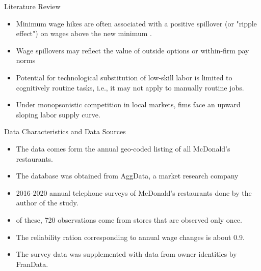 \documentclass[12pt]{beamer}
\begin{document}
\begin{frame}[allowframebreaks]{Literature Review}
	\begin{itemize}
		\item Minimum wage hikes are often associated with a positive spillover (or "ripple effect") on wages above the new minimum \cite{cengiz2019effect}.
		\item Wage spillovers may reflect the value of outside options or within-firm pay norms \cite{flinn2006minimum}
		\item Potential for technological substitution of low-skill labor is limited to cognitively routine tasks, i.e., it may not apply to manually routine jobs. \cite{phelan2019hedonic}
		\item Under monopsonistic competition in local markets, fims face an upward sloping labor supply curve. \cite{manning2013monopsony}
	\end{itemize}

\end{frame}

\begin{frame}[allowframebreaks]{Data Characteristics and Data Sources}
	\begin{itemize}
		\item The data comes form the annual geo-coded listing of all McDonald's restaurants.
		\item The database was obtained from AggData, a market research company
		\item 2016-2020 annual telephone surveys of McDonald's restaurants done by the author of the study.
		\item of these, 720 observations come from stores that are observed only once.
		\item The reliability ration corresponding to annual wage changes is about 0.9.
		\item The survey data was supplemented with data from owner identities by FranData.
	\end{itemize}
\end{frame}
\end{document}
